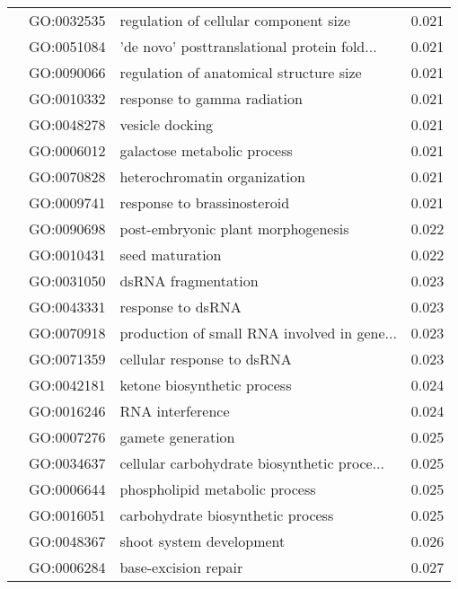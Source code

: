 \begin{longtable}{lllr}
   & GO:0032535 &        regulation of cellular component size &         0.021 \\
   & GO:0051084 &  'de novo' posttranslational protein fold... &         0.021 \\
   & GO:0090066 &      regulation of anatomical structure size &         0.021 \\
   & GO:0010332 &                  response to gamma radiation &         0.021 \\
   & GO:0048278 &                              vesicle docking &         0.021 \\
   & GO:0006012 &                  galactose metabolic process &         0.021 \\
   & GO:0070828 &                 heterochromatin organization &         0.021 \\
   & GO:0009741 &                  response to brassinosteroid &         0.021 \\
   & GO:0090698 &           post-embryonic plant morphogenesis &         0.022 \\
   & GO:0010431 &                              seed maturation &         0.022 \\
   & GO:0031050 &                          dsRNA fragmentation &         0.023 \\
   & GO:0043331 &                            response to dsRNA &         0.023 \\
   & GO:0070918 &  production of small RNA involved in gene... &         0.023 \\
   & GO:0071359 &                   cellular response to dsRNA &         0.023 \\
   & GO:0042181 &                  ketone biosynthetic process &         0.024 \\
   & GO:0016246 &                             RNA interference &         0.024 \\
   & GO:0007276 &                            gamete generation &         0.025 \\
   & GO:0034637 &  cellular carbohydrate biosynthetic proce... &         0.025 \\
   & GO:0006644 &               phospholipid metabolic process &         0.025 \\
   & GO:0016051 &            carbohydrate biosynthetic process &         0.025 \\
   & GO:0048367 &                     shoot system development &         0.026 \\
   & GO:0006284 &                         base-excision repair &         0.027 \\

\end{longtable}
